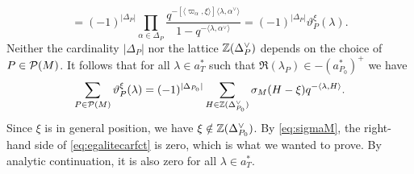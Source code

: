 \begin{paragr}
\begin{preuve}
$$=(-1)^{|\Delta_P|}\prod_{\alpha\in \Delta_P} \frac{q^{-[\langle \varpi_\alpha, \xi\rangle] \langle \lambda, \alpha^\vee\rangle}}{1-q^{-\langle \lambda, \alpha^\vee\rangle}}=(-1)^{|\Delta_P|}\vartheta_P^\xi(\lambda).$$
Neither the cardinality $|\Delta_P|$ nor the lattice $\mathbb{Z}(\Delta_P^\vee)$ depends on the choice of $P\in \mathcal{P}(M)$.
It follows that for all $\lambda \in a_T^*$ such that $\Re(\lambda_P)\in -(a_{P_0}^*)^{+}$ we have 
\begin{equation}
  \label{eq:egalitecarfct}
  \sum_{P\in \mathcal{P}(M)} \vartheta_P^\xi(\lambda)= (-1)^{|\Delta_{P_0}|} \sum_{H\in \mathbb{Z}(\Delta_{P_0}^\vee)} \sigma_M(H-\xi) q^{-\langle\lambda,H\rangle}.
\end{equation} 
Since $\xi$ is in general position, we have $\xi\notin  \mathbb{Z}(\Delta_{P_0}^\vee)$. By \eqref{eq:sigmaM}, the right-hand side of \eqref{eq:egalitecarfct} is zero, which is what we wanted to prove. By analytic continuation, it is also zero for all $\lambda \in a_T^*$.
\end{preuve}
\end{paragr}


